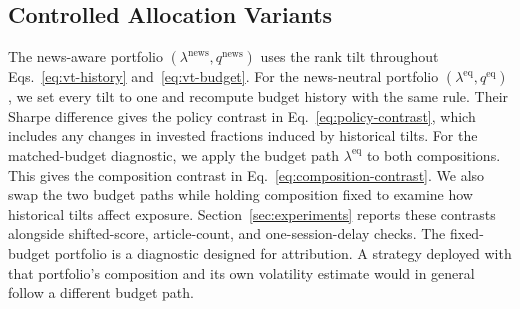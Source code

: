 \subsection{Controlled Allocation Variants}

The news-aware portfolio $(\lambda^{\mathrm{news}},q^{\mathrm{news}})$ uses the rank tilt throughout Eqs.~\eqref{eq:vt-history} and~\eqref{eq:vt-budget}. For the news-neutral portfolio $(\lambda^{\mathrm{eq}},q^{\mathrm{eq}})$, we set every tilt to one and recompute budget history with the same rule. Their Sharpe difference gives the policy contrast in Eq.~\eqref{eq:policy-contrast}, which includes any changes in invested fractions induced by historical tilts. For the matched-budget diagnostic, we apply the budget path $\lambda^{\mathrm{eq}}$ to both compositions. This gives the composition contrast in Eq.~\eqref{eq:composition-contrast}. We also swap the two budget paths while holding composition fixed to examine how historical tilts affect exposure. Section~\ref{sec:experiments} reports these contrasts alongside shifted-score, article-count, and one-session-delay checks. The fixed-budget portfolio is a diagnostic designed for attribution. A strategy deployed with that portfolio's composition and its own volatility estimate would in general follow a different budget path.
